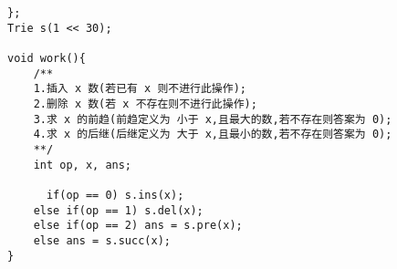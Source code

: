 \begin{verbatim}
};
Trie s(1 << 30);

void work(){
    /**
    1.插入 x 数(若已有 x 则不进行此操作);
    2.删除 x 数(若 x 不存在则不进行此操作);
    3.求 x 的前趋(前趋定义为 小于 x,且最大的数,若不存在则答案为 0);
    4.求 x 的后继(后继定义为 大于 x,且最小的数,若不存在则答案为 0);
    **/
    int op, x, ans;

      if(op == 0) s.ins(x);
    else if(op == 1) s.del(x);
    else if(op == 2) ans = s.pre(x);
    else ans = s.succ(x);
}
\end{verbatim}